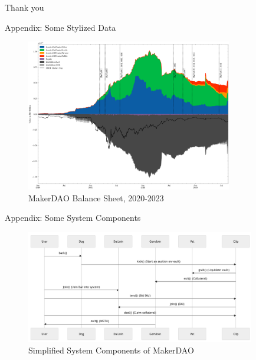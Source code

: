 \documentclass{beamer}
\begin{document}

\begin{frame}{Thank you}

\end{frame}

\begin{frame}{Appendix: Some Stylized Data}
\begin{figure}
\centering
\includegraphics[width=90mm]{Figs/historical_balancesheet_with_votes.png}
\caption{MakerDAO Balance Sheet, 2020-2023}
\label{fig1}
\end{figure}
\end{frame}

\begin{frame}{Appendix: Some System Components}
\begin{figure}
\centering
\includegraphics[width=100mm]{resources/system.png}
\caption{Simplified System Components of MakerDAO}
\label{fig2}
\end{figure}
\end{frame}
\end{document}
